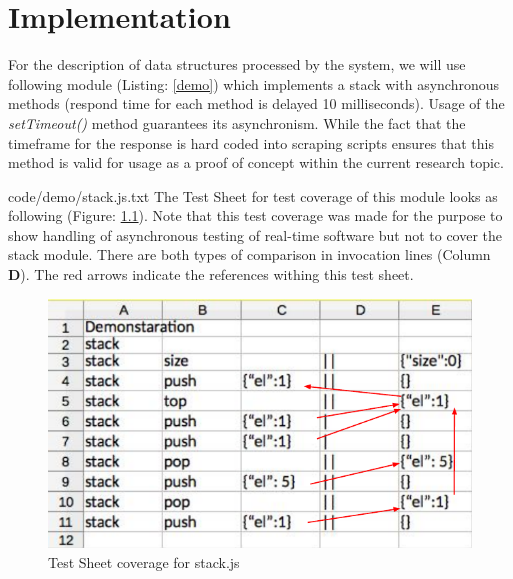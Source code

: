 \chapter{Implementation}
\label{chap:implementation}
For the description of data structures processed by the system, we will use following module (Listing: \ref{demo}) which implements a stack with asynchronous methods (respond time for each method is delayed 10 milliseconds). Usage of the \textit{setTimeout()} method guarantees its asynchronism. While the fact that the timeframe for the response is hard coded into scraping scripts ensures that this method is valid for usage as a proof of concept within the current research topic.

{code/demo/stack.js.txt}
The Test Sheet for test coverage of this module looks as following (Figure: \ref{fig:demoTS}). Note that this test coverage was made for the  purpose to show handling of asynchronous testing of real-time software but not to cover the stack module. There are both types of comparison in invocation lines (Column \textbf{D}). The red arrows indicate the references withing this test sheet.
\begin{figure}[H]
\centering
\includegraphics[width=\linewidth]{grafiken/demoTS.pdf}
\caption{Test Sheet coverage for stack.js}
\label{fig:demoTS}
\end{figure}


